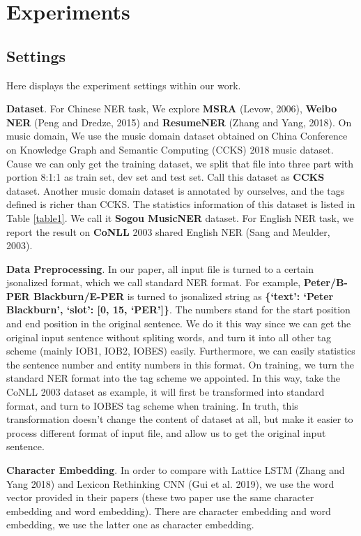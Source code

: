 \documentclass[letterpaper]{article} %
\begin{document}
\section{Experiments}

\subsection{Settings}

Here displays the experiment settings within our work.

\textbf{Dataset}. For Chinese NER task, We explore \textbf{MSRA} (Levow, 2006), \textbf{Weibo NER} (Peng and Dredze, 2015) and \textbf{ResumeNER} (Zhang and Yang, 2018). On music domain, We use the music domain dataset obtained on China Conference on Knowledge Graph and Semantic Computing (CCKS) 2018 music dataset. Cause we can only get the training dataset,  we split that file into three part with portion 8:1:1 as train set, dev set and test set. Call this dataset as \textbf{CCKS} dataset. Another music domain dataset is annotated by ourselves, and the tags defined is richer than CCKS. The statistics information of this dataset is listed in Table \ref{table1}. We call it \textbf{Sogou MusicNER} dataset. For English NER task, we report the result on \textbf{CoNLL} 2003 shared English NER (Sang and Meulder, 2003).

\textbf{Data Preprocessing}. In our paper, all input file is turned to a certain jsonalized format, which we call standard NER format. For example, \textbf{Peter/B-PER Blackburn/E-PER} is turned to jsonalized string as \textbf{\{‘text’: ‘Peter Blackburn’, ‘slot’: [0, 15, ‘PER’]\}}. The numbers stand for the start position and end position in the original sentence. We do it this way since we can get the original input sentence without spliting words, and turn it into all other tag scheme (mainly IOB1, IOB2, IOBES) easily. Furthermore, we can easily statistics the sentence number and entity numbers in this format. On training, we turn the standard NER format into the tag scheme we appointed. In this way, take the CoNLL 2003 dataset as example, it will first be transformed into standard format, and turn to IOBES tag scheme when training. In truth, this transformation doesn't change the content of dataset at all, but make it easier to process different format of input file, and allow us to get the original input sentence.

\textbf{Character Embedding}. In order to compare with Lattice LSTM (Zhang and Yang 2018) and Lexicon Rethinking CNN (Gui et al. 2019), we use the word vector provided in their papers (these two paper use the same character embedding and word embedding). There are character embedding and word embedding, we use the latter one as character embedding.
\end{document}
